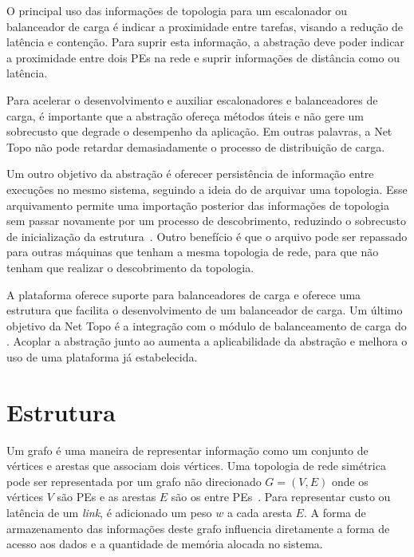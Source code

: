 O principal uso das informações de topologia para um escalonador ou balanceador de carga é indicar a proximidade entre tarefas, visando a redução de latência e contenção.
Para suprir esta informação, a abstração deve poder indicar a proximidade entre dois PEs na rede e suprir informações de distância como \hops ou latência.

Para acelerar o desenvolvimento e auxiliar escalonadores e balanceadores de carga, é importante que a abstração ofereça métodos úteis e não gere um sobrecusto que degrade o desempenho da aplicação.
Em outras palavras, a Net Topo não pode retardar demasiadamente o processo de distribuição de carga.

Um outro objetivo da abstração é oferecer persistência de informação entre execuções no mesmo sistema, seguindo a ideia do \hwloc de arquivar uma topologia. 
Esse arquivamento permite uma importação posterior das informações de topologia sem passar novamente por um processo de descobrimento, reduzindo o sobrecusto de inicialização da estrutura~\cite{broquedis:hwloc}.
Outro benefício é que o arquivo pode ser repassado para outras máquinas que tenham a mesma topologia de rede, para que não tenham que realizar o descobrimento da topologia.

A plataforma \charm oferece suporte para balanceadores de carga e oferece uma estrutura que facilita o desenvolvimento de um balanceador de carga. 
Um último objetivo da Net Topo é a integração com o módulo de balanceamento de carga do \charm.
Acoplar a abstração junto ao \charm aumenta a aplicabilidade da abstração e melhora o uso de uma plataforma já estabelecida.
 



\section{Estrutura}
\label{sec:estruturas}
Um grafo é uma maneira de representar informação como um conjunto de vértices e arestas que associam dois vértices.
Uma topologia de rede simétrica pode ser representada por um grafo não direcionado $G = (V, E)$ onde os vértices $V$ são PEs e as arestas $E$ são os \links entre PEs~\cite{Solihin}.
Para representar custo ou latência de um \textit{link}, é adicionado um peso $w$ a cada aresta $E$.
A forma de armazenamento das informações deste grafo influencia diretamente a forma de acesso aos dados e a quantidade de memória alocada no sistema.

